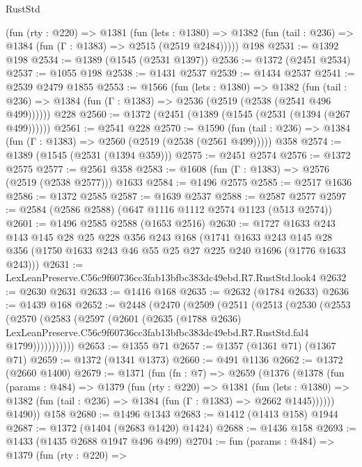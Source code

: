 \begin{lexlean}{RustStd}
\begin{coremodule}
    (fun (rty : @220) =>
    @1381
      (fun (lets : @1380) =>
      @1382 (fun (tail : @236) => @1384 (fun (Γ : @1383) => @2515 (@2519 @2484)))))
    @198
@2531 := @1392 @198
@2534 := @1389 (@1545 (@2531 @1397))
@2536 := @1372 (@2451 @2534)
@2537 := @1055 @198
@2538 := @1431 @2537
@2539 := @1434 @2537
@2541 := @2539 @2479 @1855
@2553 := @1566
    (fun (lets : @1380) =>
    @1382 (fun (tail : @236) => @1384 (fun (Γ : @1383) => @2536 (@2519 (@2538 (@2541 @496 @499))))))
    @228
@2560 := @1372 (@2451 (@1389 (@1545 (@2531 (@1394 (@267 @499))))))
@2561 := @2541 @228
@2570 := @1590
    (fun (tail : @236) => @1384 (fun (Γ : @1383) => @2560 (@2519 (@2538 (@2561 @499)))))
    @358
@2574 := @1389 (@1545 (@2531 (@1394 @359)))
@2575 := @2451 @2574
@2576 := @1372 @2575
@2577 := @2561 @358
@2583 := @1608 (fun (Γ : @1383) => @2576 (@2519 (@2538 @2577))) @1633
@2584 := @1496 @2575
@2585 := @2517 @1636
@2586 := @1372 @2585
@2587 := @1639 @2537
@2588 := @2587 @2577
@2597 := @2584 (@2586 @2588) (@647 @1116 @1112 @2574 @1123 (@513 @2574))
@2601 := @1496 @2585 @2588 (@1653 @2516)
@2630 := @1727
    @1633
    @243
    @143
    @145
    @28
    @25
    @228
    @356
    @243
    @168
    (@1741
      @1633
      @243
      @145
      @28
      @356
      (@1750 @1633 @243 @46 @55 @25 @27 @225 @240 @1696 (@1776 @1633 @243)))
@2631 := LexLeanPreserve.C56c9f60736cc3fab13bfbc383dc49ebd.R7.RustStd.look4
@2632 := @2630 @2631
@2633 := @1416 @168
@2635 := @2632 (@1784 @2633)
@2636 := @1439 @168
@2652 := @2448
    (@2470
      (@2509
        (@2511
          (@2513
            (@2530
              (@2553
                (@2570
                  (@2583
                    (@2597
                      (@2601
                        (@2635
                          (@1788 @2636)
                          LexLeanPreserve.C56c9f60736cc3fab13bfbc383dc49ebd.R7.RustStd.fal4
                          @1799)))))))))))
@2653 := @1355 @71
@2657 := @1357 (@1361 @71) (@1367 @71)
@2659 := @1372 (@1341 @1373)
@2660 := @491 @1136
@2662 := @1372 (@2660 @1400)
@2679 := @1371
    (fun (fn : @7) =>
    @2659
      (@1376
        (@1378
          (fun (params : @484) =>
          @1379
            (fun (rty : @220) =>
            @1381
              (fun (lets : @1380) =>
              @1382 (fun (tail : @236) => @1384 (fun (Γ : @1383) => @2662 @1445))))))
        @1490))
    @158
@2680 := @1496 @1343
@2683 := @1412 (@1413 @158) @1944
@2687 := @1372 (@1404 (@2683 @1420) @1424)
@2688 := @1436 @158
@2693 := @1433 (@1435 @2688 @1947 @496 @499)
@2704 := fun (params : @484) =>
  @1379
    (fun (rty : @220) =>

\end{coremodule}
\end{lexlean}
